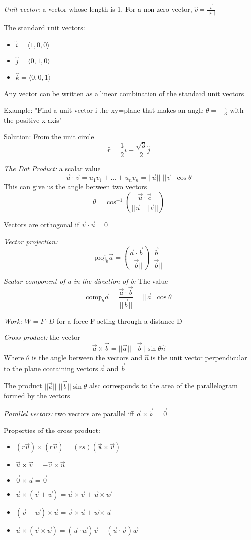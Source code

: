 \documentclass[12pt]{article}
\begin{document}
\emph{Unit vector:} a vector whose length is 1. For a non-zero vector, $\hat{v} = \frac{\vec{v}}{||v||}$

The standard unit vectors:
\begin{itemize}
    \item $\hat{i} = \langle 1, 0, 0\rangle$
    \item  $\hat{j} = \langle 0, 1, 0\rangle$
    \item $\hat{k} = \langle 0, 0, 1\rangle$
\end{itemize}

Any vector can be written as a linear combination of the standard unit vectors

Example:
"Find a unit vector i the xy=plane that makes an angle $\theta = -\frac{\pi}{3}$ with the positive x-axis"

Solution:
From the unit circle 
\[\hat{r} = \frac{1}{2} \hat{i} - \frac{\sqrt{3}}{2} \hat{j}\]

\emph{The Dot Product:} a scalar value 
\[\vec{u} \cdot \vec{v} = u_1v_1 + ... + u_nv_n = ||\vec{u}||\;||\vec{v}|| \cos\theta\]
This can give us the angle between two vectors 
\[\theta = \cos^{-1} (\frac{\vec{u} \cdot \vec{c}}{||\vec{u}||\;||\vec{v}||})\]

Vectors are orthogonal if $\vec{v} \cdot \vec{u} = 0$

\emph{Vector projection:}
\[\text{proj}_b \vec{a} =  (\frac{\vec{a}\cdot\vec{b}}{||\vec{b}||}) \frac{\vec{b}}{||\vec{b}||}\]

\emph{Scalar component of a in the direction of b:} The value 
\[\text{comp}_b \vec{a} = \frac{\vec{a}\cdot\vec{b}}{||\vec{b}||} = ||\vec{a}|| \cos \theta\]

\emph{Work:} $W = F \cdot D$ for a force F acting through a distance D

\emph{Cross product:} the vector 
\[\vec{a} \times \vec{b} = ||\vec{a}|| \; ||\vec{b}|| \sin \theta \hat{n}\]
Where $\theta$ is the angle between the vectors and $\hat{n}$ is the unit vector perpendicular to the plane containing vectors $\vec{a}$ and $\vec{b}$

The product $||\vec{a}|| \; ||\vec{b}|| \sin \theta$ also corresponds to the area of the parallelogram formed by the vectors 

\emph{Parallel vectors:} two vectors are parallel iff $\vec{a} \times \vec{b} = \vec{0}$

Properties of the cross product:
\begin{itemize}
    \item $(r \vec{u}) \times (r \vec{v}) = (rs)(\vec{u} \times \vec{v})$
    \item $\vec{u} \times \vec{v} = - \vec{v} \times \vec{u}$
    \item $\vec{0} \times \vec{u} = \vec{0}$
    \item $\vec{u} \times (\vec{v} + \vec{w}) = \vec{u}\times \vec{v} + \vec{u}\times \vec{w}$
    \item $(\vec{v} + \vec{w}) \times \vec{u} = \vec{v} \times \vec{u} + \vec{w} \times \vec{u}$
    \item $\vec{u} \times (\vec{v} \times \vec{w}) = (\vec{u}\cdot \vec{w})\vec{v} - (\vec{u} \cdot \vec{v})\vec{w}$
\end{itemize}
\end{document}
